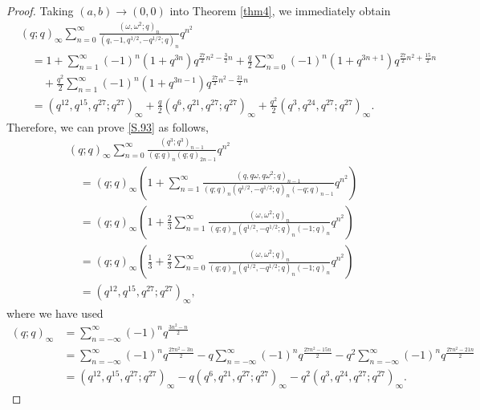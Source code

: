 \documentclass[reqno,12pt]{amsart}
\theoremstyle{remark}
\numberwithin{equation}{section}
\begin{document}
\begin{proof}
Taking $\left(a,b\right)\to\left(0,0\right)$ into Theorem \ref{thm4}, we immediately obtain
\begin{align}
&\left(q;q\right)_{\infty}\sum_{n=0}^{\infty}
\frac{\left(\omega,\omega^2;q\right)_n}
{\left(q,-1,q^{1/2},-q^{1/2};q\right)_n}q^{n^2}\nonumber\\
&\quad=1+\sum_{n=1}^{\infty}\left(-1\right)^n\left(1+q^{3n}\right)
q^{\frac{27}{2}n^2-\frac{3}{2}n}
+\frac{q}{2}\sum_{n=0}^{\infty}\left(-1\right)^n\left(1+q^{3n+1}\right)
q^{\frac{27}{2}n^2+\frac{15}{2}n}\nonumber\\
&\qquad+\frac{q^2}{2}\sum_{n=1}^{\infty}\left(-1\right)^n\left(1+q^{3n-1}\right)
q^{\frac{27}{2}n^2-\frac{21}{2}n}\nonumber\\
&\quad=\left(q^{12},q^{15},q^{27};q^{27}\right)_{\infty}
+\frac{q}{2}\left(q^{6},q^{21},q^{27};q^{27}\right)_{\infty}
+\frac{q^2}{2}\left(q^{3},q^{24},q^{27};q^{27}\right)_{\infty}.\label{A9}
\end{align}
Therefore, we can prove \eqref{S.93} as follows,
\begin{align}
&\left(q;q\right)_{\infty}\sum_{n=0}^{\infty}
\frac{\left(q^3;q^3\right)_{n-1}}
{\left(q;q\right)_n\left(q;q\right)_{2n-1}}q^{n^2}\nonumber\\
&\quad=\left(q;q\right)_{\infty}\left(1+\sum_{n=1}^{\infty}
\frac{\left(q,q\omega,q\omega^2;q\right)_{n-1}}
{\left(q;q\right)_n\left(q^{1/2},-q^{1/2};q\right)_{n}
\left(-q;q\right)_{n-1}}q^{n^2}\right)\nonumber\\
&\quad=\left(q;q\right)_{\infty}\left(1+\frac{2}{3}\sum_{n=1}^{\infty}
\frac{\left(\omega,\omega^2;q\right)_{n}}
{\left(q;q\right)_n\left(q^{1/2},-q^{1/2};q\right)_{n}
\left(-1;q\right)_{n}}q^{n^2}\right)\nonumber\\
&\quad=\left(q;q\right)_{\infty}\left(\frac{1}{3}+\frac{2}{3}\sum_{n=0}^{\infty}
\frac{\left(\omega,\omega^2;q\right)_{n}}
{\left(q;q\right)_n\left(q^{1/2},-q^{1/2};q\right)_{n}
\left(-1;q\right)_{n}}q^{n^2}\right)\nonumber\\
&\quad=\left(q^{12},q^{15},q^{27};q^{27}\right)_{\infty},
\end{align}
where we have used
\begin{align}
\left(q;q\right)_{\infty}%
&=\sum_{n=-\infty}^{\infty}\left(-1\right)^nq^{\frac{3n^2-n}{2}}\nonumber\\
&=\sum_{n=-\infty}^{\infty}\left(-1\right)^nq^{\frac{27n^2-3n}{2}}
-q\sum_{n=-\infty}^{\infty}\left(-1\right)^nq^{\frac{27n^2-15n}{2}}
-q^2\sum_{n=-\infty}^{\infty}\left(-1\right)^nq^{\frac{27n^2-21n}{2}}\nonumber\\
&=\left(q^{12},q^{15},q^{27};q^{27}\right)_{\infty}
-q\left(q^{6},q^{21},q^{27};q^{27}\right)_{\infty}
-q^2\left(q^{3},q^{24},q^{27};q^{27}\right)_{\infty}.\label{A10}
\end{align}


\end{proof}
\end{document}
